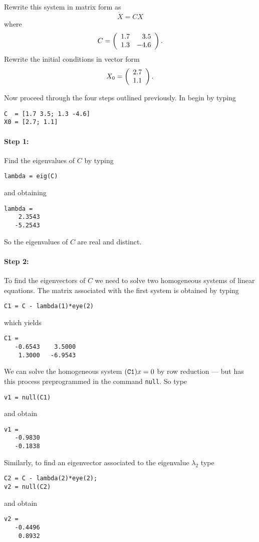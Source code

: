 Rewrite this system in matrix form as
\[
\dot{X} = CX
\]
where
\[
C = \left(\begin{array}{rr} 1.7 & 3.5\\ 1.3 &-4.6\end{array}\right).
\]
Rewrite the initial conditions in vector form
\[
X_0 = \left(\begin{array}{r} 2.7 \\ 1.1\end{array}\right).
\]

Now proceed through the four steps outlined previously.  In \Matlab begin by
typing
\begin{verbatim}
C  = [1.7 3.5; 1.3 -4.6]
X0 = [2.7; 1.1]
\end{verbatim}

\paragraph{Step 1:}  Find the eigenvalues of $C$ by typing
\begin{verbatim}
lambda = eig(C)
\end{verbatim}
and obtaining
\begin{verbatim}
lambda =
    2.3543
   -5.2543
\end{verbatim}
So the eigenvalues of $C$ are real and distinct.

\paragraph{Step 2:}  To find the eigenvectors of $C$ we need to solve
two homogeneous systems of linear equations.
The matrix associated with the first system is obtained by typing
\begin{verbatim}
C1 = C - lambda(1)*eye(2)
\end{verbatim}
which yields
\begin{verbatim}
C1 =
   -0.6543    3.5000
    1.3000   -6.9543
\end{verbatim}
We can solve the homogeneous system $({\tt C1})x=0$ by row reduction --- but 
\Matlab has this process preprogrammed in the command {\tt null}. 
  So type
\begin{verbatim}
v1 = null(C1)
\end{verbatim}
and obtain
\begin{verbatim}
v1 =
   -0.9830
   -0.1838
\end{verbatim}
Similarly, to find an eigenvector associated to the eigenvalue $\lambda_2$
type
\begin{verbatim}
C2 = C - lambda(2)*eye(2);
v2 = null(C2)
\end{verbatim}
and obtain
\begin{verbatim}
v2 =
   -0.4496
    0.8932
\end{verbatim}


